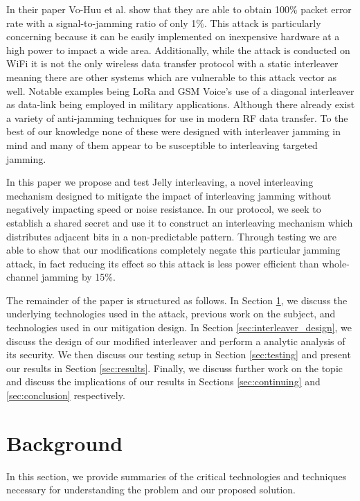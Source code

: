 \documentclass[sigconf]{acmart}
\begin{document}
In their paper Vo-Huu et al. show that they are able to obtain 100\% packet error rate with a signal-to-jamming ratio of only 1\%. This attack is particularly concerning because it can be easily implemented on inexpensive hardware at a high power to impact a wide area. Additionally, while the attack is conducted on WiFi it is not the only wireless data transfer protocol with a static interleaver meaning there are other systems which are vulnerable to this attack vector as well. Notable examples being LoRa and GSM Voice's use of a diagonal interleaver as data-link being employed in military applications\cite{knight2016decoding}. Although there already exist a variety of anti-jamming techniques for use in modern RF data transfer. To the best of our knowledge none of these were designed with interleaver jamming in mind and many of them appear to be susceptible to interleaving targeted jamming. 

In this paper we propose and test Jelly interleaving, a novel interleaving mechanism designed to mitigate the impact of interleaving jamming without negatively impacting speed or noise resistance. In our protocol, we seek to establish a shared secret and use it to construct an interleaving mechanism which distributes adjacent bits in a non-predictable pattern. Through testing we are able to show that our modifications completely negate this particular jamming attack, in fact reducing its effect so this attack is less power efficient than whole-channel jamming by 15\%.

The remainder of the paper is structured as follows. In Section \ref{sec:background}, we discuss the underlying technologies used in the attack, previous work on the subject, and technologies used in our mitigation design. In Section \ref{sec:interleaver_design}, we discuss the design of our modified interleaver and perform a analytic analysis of its security. We then discuss our testing setup in Section \ref{sec:testing} and present our results in Section \ref{sec:results}. Finally, we discuss further work on the topic and discuss the implications of our results in Sections \ref{sec:continuing} and \ref{sec:conclusion} respectively. 

\section{Background}
\label{sec:background}

In this section, we provide summaries of the critical technologies and techniques necessary for understanding the problem and our proposed solution.
\end{document}
